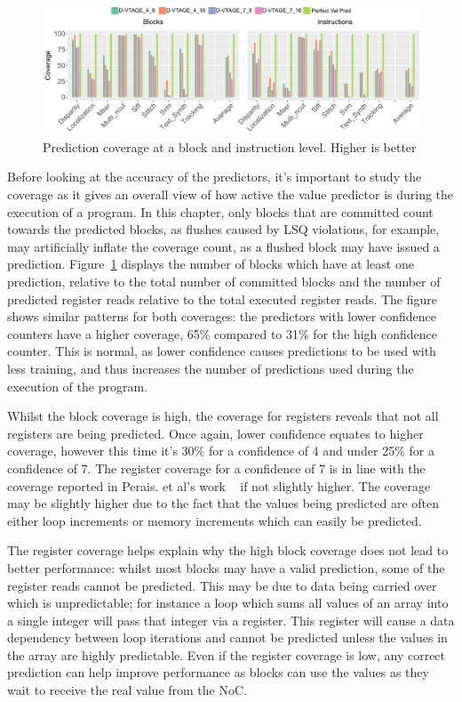 \begin{figure}[t]
    \centering
    \includegraphics[width=1\textwidth]{chapter3/graphics/coverageFull.pdf}
    \caption{Prediction coverage at a block and instruction level. Higher is better}
    \label{fig:vtag_cov_block}
	\vspace{1em}
\end{figure}

Before looking at the accuracy of the predictors, it's important to study the coverage as it gives an overall view of how active the value predictor is during the execution of a program.
In this chapter, only blocks that are committed count towards the predicted blocks, as flushes caused by LSQ violations, for example, may artificially inflate the coverage count, as a flushed block may have issued a prediction.
Figure~\ref{fig:vtag_cov_block} displays the number of blocks which have at least one prediction, relative to the total number of committed blocks and the number of predicted register reads relative to the total executed register reads.
The figure shows similar patterns for both coverages: the predictors with lower confidence counters have a higher coverage, 65\% compared to 31\% for the high confidence counter.
This is normal, as lower confidence causes predictions to be used with less training, and thus increases the number of predictions used during the execution of the program.

Whilst the block coverage is high, the coverage for registers reveals that not all registers are being predicted.
Once again, lower confidence equates to higher coverage, however this time it's 30\% for a confidence of 4 and under 25\% for a confidence of 7.
The register coverage for a confidence of 7 is in line with the coverage reported in Perais. et al's work ~\cite{peraisBeBop2015, peraisVTAGE2014} if not slightly higher.
The coverage may be slightly higher due to the fact that the values being predicted are often either loop increments or memory increments which can easily be predicted.

The register coverage helps explain why the high block coverage does not lead to better performance: whilst most blocks may have a valid prediction, some of the register reads cannot be predicted.
This may be due to data being carried over which is unpredictable; for instance a loop which sums all values of an array into a single integer will pass that integer via a register.
This register will cause a data dependency between loop iterations and cannot be predicted unless the values in the array are highly predictable.
Even if the register coverage is low, any correct prediction can help improve performance as blocks can use the values as they wait to receive the real value from the NoC.

